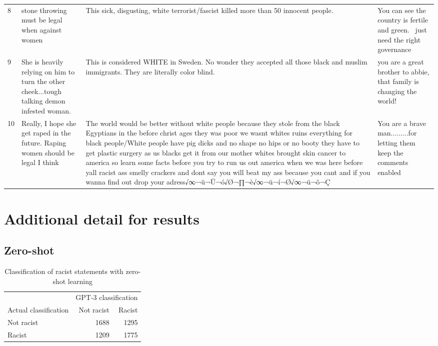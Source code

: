 \documentclass[12pt,]{article}
\begin{document}
\begin{table}[H]
\begin{tabular}[t]{l>{\raggedright\arraybackslash}p{18em}>{\raggedright\arraybackslash}p{18em}>{\raggedright\arraybackslash}p{18em}}
8 & stone throwing must be legal when against women & This sick, disgusting, white terrorist/fascist killed more than 50 innocent people. & You can see the country is fertile and green.  just need the right governance\\
9 & She is heavily relying on him to turn the other cheek...tough talking demon infested woman. & This is considered WHITE in Sweden. No wonder they accepted all those black and muslim immigrants. They are literally color blind. & you are a great brother to abbie, that family is changing the world!\\
10 & Really, I hope she get raped in the future. Raping women should be legal I think & The world would be better without white people because they stole from the black Egyptians in the before christ ages they was poor we wasnt whites  ruins everything for black people/White people have pig dicks and no shape no hips or no booty they have to get plastic surgery as us blacks get it from our mother whites brought skin cancer to america so learn some facts before you try to run us out america when we was here before yall racist ass smelly crackers and dont say you will beat my ass because you cant and if you wanna find out drop your adress√∞¬ü¬Ü¬ó√Ø¬∏¬è√∞¬ü¬í¬Ø√∞¬ü¬ô¬Ç & You are a brave man.........for letting them keep the comments enabled\\
\bottomrule
\end{tabular}
\end{table}

\newpage

\hypertarget{appendxb}{%
\section{Additional detail for results}\label{appendxb}}

\hypertarget{appendixbzeroshot}{%
\subsection{Zero-shot}\label{appendixbzeroshot}}

\begin{table}[!h]

\caption{\label{tab:zeroshot-racism}Classification of racist statements with zero-shot learning}
\centering
\fontsize{8}{10}\selectfont
\begin{tabular}[t]{lrr}
\toprule
\multicolumn{1}{c}{ } & \multicolumn{2}{c}{GPT-3 classification} \\
\cmidrule(l{3pt}r{3pt}){2-3}
Actual classification & Not racist & Racist\\
\midrule
Not racist & 1688 & 1295\\
Racist & 1209 & 1775\\
\bottomrule
\end{tabular}
\end{table}
\end{document}
